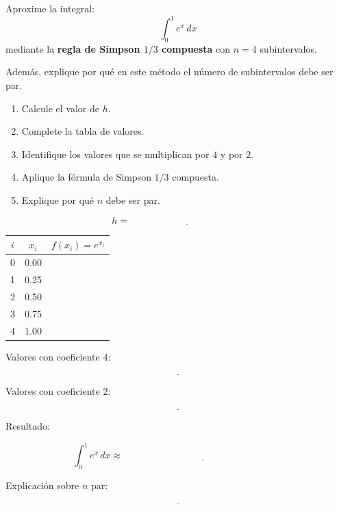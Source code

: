 \documentclass[10pt,respuestas,a4]{aleph-examen}
\begin{document}
\begin{preguntas}

\item
Aproxime la integral: 
\[
\int_0^1 e^x\,dx
\]
mediante la \textbf{regla de Simpson $1/3$ compuesta} con $n=4$ subintervalos.

Además, explique por qué en este método el número de subintervalos debe ser par.

\begin{enumerate}[label=\alph*)]
    \item Calcule el valor de $h$.
    \item Complete la tabla de valores.
    \item Identifique los valores que se multiplican por $4$ y por $2$.
    \item Aplique la fórmula de Simpson $1/3$ compuesta.
    \item Explique por qué $n$ debe ser par.
\end{enumerate}

\[
h=\underline{\hspace{5cm}}
\]

\begin{center}
\renewcommand{\arraystretch}{1.4}
\begin{tabular}{c|c|c}
\toprule
$i$ & $x_i$ & $f(x_i)=e^{x_i}$ \\
\midrule
0 & 0.00 &  \\
1 & 0.25 &  \\
2 & 0.50 &  \\
3 & 0.75 &  \\
4 & 1.00 &  \\
\bottomrule
\end{tabular}
\end{center}

Valores con coeficiente $4$:

\[
\underline{\hspace{10cm}}
\]

Valores con coeficiente $2$:

\[
\underline{\hspace{10cm}}
\]

Resultado:

\[
\int_0^1 e^x\,dx
\approx
\underline{\hspace{7cm}}
\]

Explicación sobre $n$ par:

\[
\underline{\hspace{14cm}}
\]


\end{preguntas}
\end{document}
